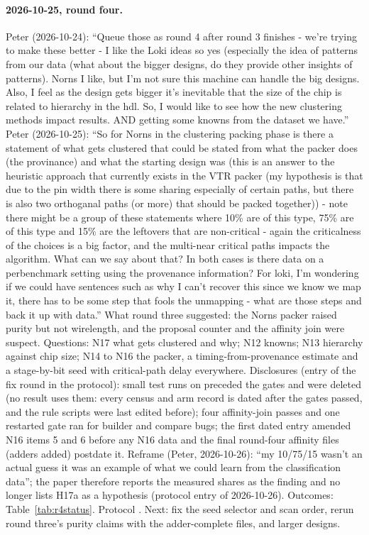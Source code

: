 
\paragraph{2026-10-25, round four.} Peter (2026-10-24): ``Queue those as round 4 after round 3 finishes - we're trying to make these better - I like the Loki ideas so yes (especially the idea of patterns from our data (what about the bigger designs, do they provide other insights of patterns). Norns I like, but I'm not sure this machine can handle the big designs. Also, I feel as the design gets bigger it's inevitable that the size of the chip is related to hierarchy in the hdl. So, I would like to see how the new clustering methods impact results. AND getting some knowns from the dataset we have.'' Peter (2026-10-25): ``So for Norns in the clustering packing phase is there a statement of what gets clustered that could be stated from what the packer does (the provinance) and what the starting design was (this is an answer to the heuristic approach that currently exists in the VTR packer (my hypothesis is that due to the pin width there is some sharing especially of certain paths, but there is also two orthoganal paths (or more) that should be packed together)) - note there might be a group of these statements where 10\% are of this type, 75\% are of this type and 15\% are the leftovers that are non-critical - again the criticalness of the choices is a big factor, and the multi-near critical paths impacts the algorithm. What can we say about that? In both cases is there data on a perbenchmark setting using the provenance information? For loki, I'm wondering if we could have sentences such as why I can't recover this since we know we map it, there has to be some step that fools the unmapping - what are those steps and back it up with data.''
What round three suggested: the Norns packer raised purity but not wirelength, and the proposal counter and the affinity join were suspect.
Questions: N17 what gets clustered and why; N12 knowns; N13 hierarchy against chip size; N14 to N16 the packer, a timing-from-provenance estimate and a stage-by-bit seed with critical-path delay everywhere.
Disclosures (entry of the fix round in the protocol): small test runs on  preceded the gates and were deleted (no result uses them: every census and arm record is dated after the gates passed, and the rule scripts were last edited before); four affinity-join passes and one restarted gate ran for builder and compare bugs; the first dated entry amended N16 items 5 and 6 before any N16 data and the final round-four affinity files (adders added) postdate it.
Reframe (Peter, 2026-10-26): ``my 10/75/15 wasn't an actual guess it was an example of what we could learn from the classification data''; the paper therefore reports the measured shares as the finding and no longer lists H17a as a hypothesis (protocol entry of 2026-10-26).
Outcomes: Table~\ref{tab:r4status}. Protocol . Next: fix the seed selector and scan order, rerun round three's purity claims with the adder-complete files, and larger designs.

